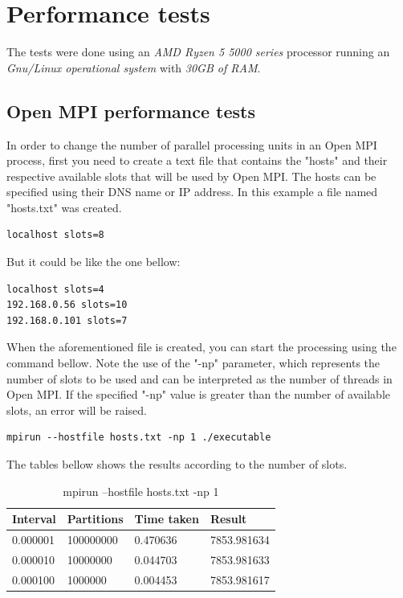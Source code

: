 	\section{Performance tests}
\par The tests were done using an \textit{AMD Ryzen 5 5000 series} processor running an \textit{Gnu/Linux operational system} with \textit{30GB of RAM}.\newline

\subsection{Open MPI performance tests}

\par In order to change the number of parallel processing units in an Open MPI process, first you need to create a text file that contains the "hosts" and their respective available slots that will be used by Open MPI.  The hosts can be specified using their DNS name or IP address. In this example a file named "hosts.txt" was created.

\begin{lstlisting}
localhost slots=8
\end{lstlisting}

\par But it could be like the one bellow:

\begin{lstlisting}
localhost slots=4
192.168.0.56 slots=10
192.168.0.101 slots=7
\end{lstlisting}

\par When the aforementioned file is created, you can start the processing using the command bellow. Note the use of the "-np" parameter, which represents the number of slots to be used and can be interpreted as the number of threads in Open MPI. If the specified "-np" value is greater than the number of available slots, an error will be raised.

\begin{lstlisting}
mpirun --hostfile hosts.txt -np 1 ./executable
\end{lstlisting}

\par The tables bellow shows the results according to the number of slots. 

\begin{table}[h]
	\caption{mpirun --hostfile hosts.txt -np 1}
	\begin{center}
		\centering
		\begin{tabular}{|l|l|l|l|}
			\hline
			Interval & Partitions & Time taken & Result \\
			\hline
			0.000001 & 100000000 & 0.470636 & 7853.981634 \\
			0.000010 & 10000000 & 0.044703 & 7853.981633 \\
			0.000100 & 1000000 & 0.004453 & 7853.981617 \\
			\hline
		\end{tabular}
	\end{center}
\end{table}

